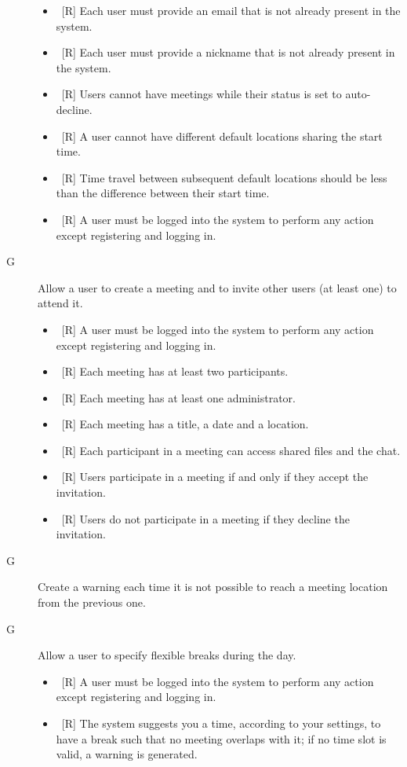\begin{description}
\begin{itemize}
\item~[R] Each user must provide an email that is not already present in the system.
\item~[R] Each user must provide a nickname that is not already present in the system.
\item~[R] Users cannot have meetings while their status is set to auto-decline.
\item~[R] A user cannot have different default locations sharing the start time.
\item~[R] Time travel between subsequent default locations should be less than the difference between their start time.
\item~[R] A user must be logged into the system to perform any action except registering and logging in.
\end{itemize}

\item[G\thecountReq] Allow a user to create a meeting and to invite other users (at least one) to attend it.

\begin{itemize}
\item~[R] A user must be logged into the system to perform any action except registering and logging in.
\item~[R] Each meeting has at least two participants.
\item~[R] Each meeting has at least one administrator.
\item~[R] Each meeting has a title, a date and a location.
\item~[R] Each participant in a meeting can access shared files and the chat.
\item~[R] Users participate in a meeting if and only if they accept the invitation.
\item~[R] Users do not participate in a meeting if they decline the invitation.
\end{itemize}

\item[G\thecountReq] Create a warning each time it is not possible to reach a meeting location from the previous one.

\item[G\thecountReq] Allow a user to specify flexible breaks during the day.

\begin{itemize}
\item~[R] A user must be logged into the system to perform any action except registering and logging in.
\item~[R] The system suggests you a time, according to your settings, to have a break such that no meeting overlaps with it; if no time slot is valid, a warning is generated.
\end{itemize}


\end{description}
